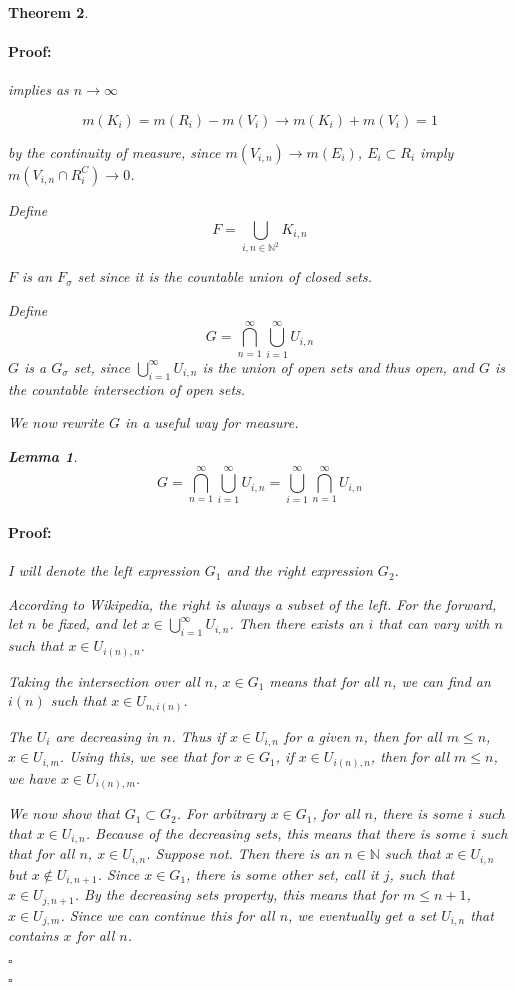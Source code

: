 \documentclass{article}
\newenvironment{proof}{\paragraph{Proof:}}{\hfill$\square$}
\newtheorem{theorem}{Theorem}
\newtheorem{lemma}[theorem]{Lemma}
\newcommand{\N}{\mathbb{N}}
\begin{document}
\begin{theorem}
\begin{proof}
implies as $n \rightarrow \infty$

\[
m(K_i) = m(R_i) - m(V_i) \longrightarrow 
m(K_i) + m(V_i) = 1
\]

by the continuity of measure, since $m(V_{i,n}) \rightarrow m(E_i)$, $E_i \subset R_i$ imply $m(V_{i,n} \cap R_i^C) \rightarrow 0$.

Define
\[
F = \bigcup_{i,n \in \N^2} K_{i, n}
\]

$F$ is an $F_\sigma$ set since it is the countable union of closed sets.

Define
\[
G = \bigcap_{n=1}^\infty \bigcup_{i=1}^\infty U_{i, n}
\]
$G$ is a $G_\sigma$ set, since $\bigcup_{i=1}^\infty U_{i, n}$ is the union of open sets and thus open, and $G$ is the countable intersection of open sets.

We now rewrite $G$ in a useful way for measure.

\begin{lemma}
\[
G = \bigcap_{n=1}^\infty \bigcup_{i=1}^\infty U_{i, n} = \bigcup_{i=1}^\infty \bigcap_{n=1}^\infty U_{i, n}
\]
\begin{proof}
I will denote the left expression $G_1$ and the right expression $G_2$.

According to Wikipedia, the right is always a subset of the left. For the forward, let $n$ be fixed, and let $x \in \bigcup_{i=1}^\infty U_{i, n}$. Then there exists an $i$ that can vary with $n$ such that $x \in U_{i(n), n}$.

Taking the intersection over all $n$, $x \in G_1$ means that for all $n$, we can find an $i(n)$ such that $x \in U_{n, i(n)}$.

The $U_i$ are decreasing in $n$. Thus if $x \in U_{i, n}$ for a given $n$, then for all $m \leq n$, $x \in U_{i, m}$. Using this, we see that for $x \in G_1$, if $x \in U_{i(n), n}$, then for all $m \leq n$, we have $x \in U_{i(n), m}$.

We now show that $G_1 \subset G_2$. For arbitrary $x \in G_1$, for all $n$, there is some $i$ such that $x \in U_{i, n}$. Because of the decreasing sets, this means that there is some $i$ such that for all $n$, $x \in U_{i, n}$. Suppose not. Then there is an $n \in \N$ such that $x \in U_{i, n}$ but $x \notin U_{i, n+1}$. Since $x \in G_1$, there is some other set, call it $j$, such that $x \in U_{j, n+1}$. By the decreasing sets property, this means that for $m \leq n+1$, $x \in U_{j, m}$. Since we can continue this for all $n$, we eventually get a set $U_{i, n}$ that contains $x$ for all $n$.


\end{proof}
\end{lemma}
\end{proof}
\end{theorem}
\end{document}
